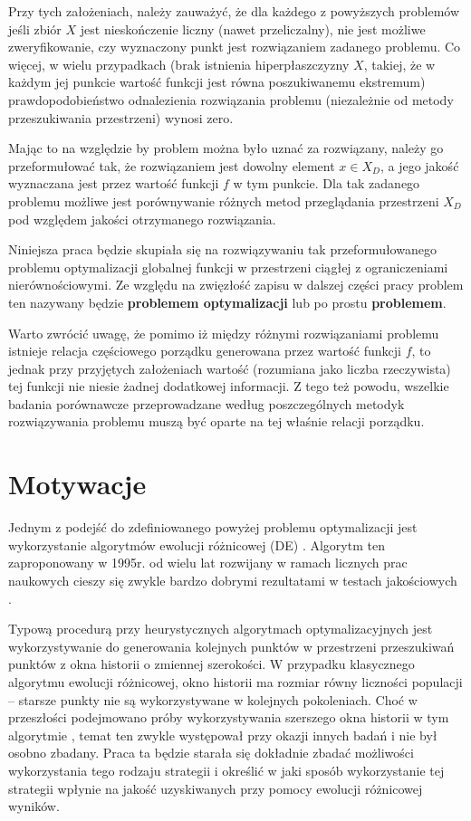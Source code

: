 \documentclass[12pt,a4paper]{report}
\begin{document}
{\par{
Przy tych założeniach, należy zauważyć, że dla każdego z powyższych problemów jeśli zbiór $X$ jest nieskończenie liczny (nawet przeliczalny), nie jest możliwe zweryfikowanie, czy wyznaczony punkt jest rozwiązaniem zadanego problemu. Co więcej, w wielu przypadkach (brak istnienia hiperpłaszczyzny $X$, takiej, że w każdym jej punkcie wartość funkcji jest równa poszukiwanemu ekstremum) prawdopodobieństwo odnalezienia rozwiązania problemu (niezależnie od metody przeszukiwania przestrzeni) wynosi zero.
}
\par{
Mając to na względzie by problem można było uznać za rozwiązany, należy go przeformułować tak, że rozwiązaniem jest dowolny element $x \in X_D$, a jego jakość wyznaczana jest przez wartość funkcji $f$ w tym punkcie. Dla tak zadanego problemu możliwe jest porównywanie różnych metod przeglądania przestrzeni $X_D$ pod względem jakości otrzymanego rozwiązania.
}
\par{
Niniejsza praca będzie skupiała się na rozwiązywaniu tak przeformułowanego problemu optymalizacji globalnej funkcji w przestrzeni ciągłej z ograniczeniami nierównościowymi. Ze względu na zwięzłość zapisu w dalszej części pracy problem ten nazywany będzie \textbf{problemem optymalizacji} lub po prostu \textbf{problemem}. 
}
\par{
Warto zwrócić uwagę, że pomimo iż między różnymi rozwiązaniami problemu istnieje relacja częściowego porządku generowana przez wartość funkcji $f$, to jednak przy przyjętych założeniach wartość (rozumiana jako liczba rzeczywista) tej funkcji nie niesie żadnej dodatkowej informacji. Z tego też powodu, wszelkie badania porównawcze przeprowadzane według poszczególnych metodyk rozwiązywania problemu muszą być oparte na tej właśnie relacji porządku.
}

\section{Motywacje}
\par{
Jednym z podejść do zdefiniowanego powyżej problemu optymalizacji jest wykorzystanie algorytmów ewolucji różnicowej (DE) \cite{RainerStorn}. Algorytm ten zaproponowany w 1995r. od wielu lat rozwijany w ramach licznych prac naukowych \cite{Opara,SpringerIntroToEvol} cieszy się zwykle bardzo dobrymi rezultatami w testach jakościowych \cite{CEC2013Comp}. 
}
\par{
Typową procedurą przy heurystycznych algorytmach optymalizacyjnych jest wykorzystywanie do generowania kolejnych punktów w przestrzeni przeszukiwań punktów z okna historii o zmiennej szerokości. W przypadku klasycznego algorytmu ewolucji różnicowej, okno historii ma rozmiar równy liczności populacji -- starsze punkty nie są wykorzystywane w kolejnych pokoleniach. Choć w przeszłości podejmowano próby wykorzystywania szerszego okna historii w tym algorytmie \cite{JADE,SHADE}, temat ten zwykle występował przy okazji innych badań i nie był osobno zbadany. Praca ta będzie starała się dokładnie zbadać możliwości wykorzystania tego rodzaju strategii i określić w jaki sposób wykorzystanie tej strategii wpłynie na jakość uzyskiwanych przy pomocy ewolucji różnicowej wyników.
}

}
\end{document}

